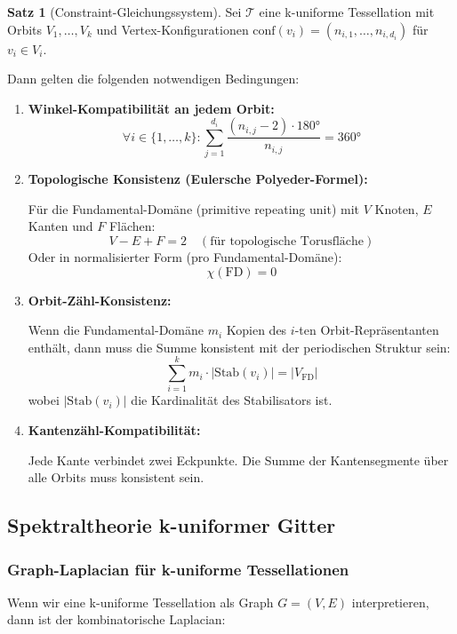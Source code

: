 \documentclass[a4paper,12pt]{article}
\theoremstyle{definition}
\newtheorem{satz}{Satz}[section]
\begin{document}
\begin{satz}[Constraint-Gleichungssystem]
	Sei $\mathcal{T}$ eine k-uniforme Tessellation mit Orbits $V_1, \ldots, V_k$ und Vertex-Konfigurationen $\text{conf}(v_i) = (n_{i,1}, \ldots, n_{i,d_i})$ für $v_i \in V_i$.
	
	Dann gelten die folgenden notwendigen Bedingungen:
	
	\begin{enumerate}
		\item \textbf{Winkel-Kompatibilität an jedem Orbit:}
		\[
		\forall i \in \{1,\ldots,k\}: \sum_{j=1}^{d_i} \frac{(n_{i,j} - 2) \cdot 180°}{n_{i,j}} = 360°
		\]
		
		\item \textbf{Topologische Konsistenz (Eulersche Polyeder-Formel):}
		
		Für die Fundamental-Domäne (primitive repeating unit) mit $V$ Knoten, $E$ Kanten und $F$ Flächen:
		\[
		V - E + F = 2 \quad (\text{für topologische Torusfläche})
		\]
		Oder in normalisierter Form (pro Fundamental-Domäne):
		\[
		\chi(\text{FD}) = 0
		\]
		
		\item \textbf{Orbit-Zähl-Konsistenz:}
		
		Wenn die Fundamental-Domäne $m_i$ Kopien des $i$-ten Orbit-Repräsentanten enthält, dann muss die Summe konsistent mit der periodischen Struktur sein:
		\[
		\sum_{i=1}^{k} m_i \cdot |\text{Stab}(v_i)| = |V_{\text{FD}}|
		\]
		wobei $|\text{Stab}(v_i)|$ die Kardinalität des Stabilisators ist.
		
		\item \textbf{Kantenzähl-Kompatibilität:}
		
		Jede Kante verbindet zwei Eckpunkte. Die Summe der Kantensegmente über alle Orbits muss konsistent sein.
	\end{enumerate}
\end{satz}

\subsection{Spektraltheorie k-uniformer Gitter}

\subsubsection{Graph-Laplacian für k-uniforme Tessellationen}

Wenn wir eine k-uniforme Tessellation als Graph $G = (V, E)$ interpretieren, dann ist der kombinatorische Laplacian:
\end{document}
